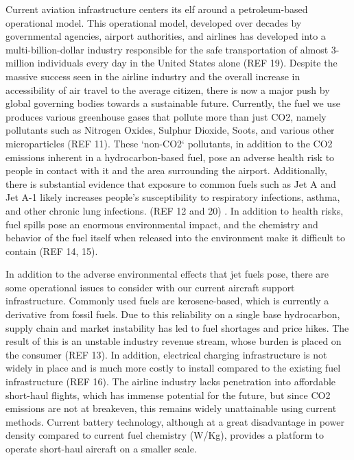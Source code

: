 \documentclass{article}
\begin{document}
Current aviation infrastructure centers its  elf around a petroleum-based operational model.
This operational model, developed over decades by governmental agencies, airport authorities, and airlines has developed into a multi-billion-dollar industry responsible for the safe transportation of almost 3-million individuals every day in the United States alone (REF 19). Despite the massive success seen in  the airline industry and the overall increase in accessibility of air travel to the average citizen, there is now a major push by global governing bodies towards a sustainable future. Currently, the fuel we use produces various greenhouse gases that pollute more than just CO2, namely pollutants such as Nitrogen Oxides, Sulphur Dioxide, Soots, and various other microparticles (REF 11). These ‘non-CO2‘ pollutants, in addition to the CO2 emissions inherent in a hydrocarbon-based fuel, pose an adverse health risk to people in contact with it and the area surrounding the airport. Additionally, there is substantial evidence that exposure to common fuels such as Jet A and Jet A-1 likely increases people’s susceptibility to respiratory infections, asthma, and other chronic lung infections. (REF 12 and 20) . In addition to health risks, fuel spills pose an enormous environmental impact, and the chemistry and behavior of the fuel itself when released into the environment make it difficult to contain (REF 14, 15).\par 
In addition to the adverse environmental effects that jet fuels pose, there are some operational issues to consider with our current aircraft support infrastructure. Commonly used fuels are kerosene-based, which is currently a derivative from fossil fuels. Due to this reliability on a single base hydrocarbon, supply chain and market instability has led to fuel shortages and price hikes. The result of this is an unstable industry revenue stream, whose burden is placed on the consumer (REF 13). In addition, electrical charging infrastructure is not widely in place and is much more costly to install compared to the existing fuel infrastructure (REF 16). The airline industry lacks penetration into affordable short-haul flights, which has immense potential for the future, but since CO2 emissions are not at breakeven, this remains widely unattainable using current methods. Current battery technology, although at a great disadvantage in power density compared to current fuel chemistry (W/Kg), provides a platform to operate short-haul aircraft on a smaller scale.\par 
\end{document}
